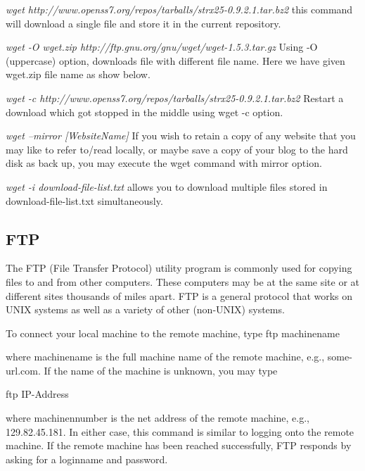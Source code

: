 \documentclass{article}
\begin{document}
\hspace{10mm} \textit{wget http://www.openss7.org/repos/tarballs/strx25-0.9.2.1.tar.bz2} this command will download a single file and store it in the current repository.

\hspace{10mm} \textit{wget -O wget.zip http://ftp.gnu.org/gnu/wget/wget-1.5.3.tar.gz} Using -O (uppercase) option, downloads file with different file name. Here we have given wget.zip file name as show below.

\hspace{10mm} \textit {wget -c http://www.openss7.org/repos/tarballs/strx25-0.9.2.1.tar.bz2} Restart a download which got stopped in the middle using wget -c option.

\hspace{10mm} \textit{wget --mirror [WebsiteName]} If you wish to retain a copy of any website that you may like to refer to/read locally, or maybe save a copy of your blog to the hard disk as back up, you may execute the wget command with mirror option.

\hspace{10mm} \textit{wget -i download-file-list.txt} allows you to download multiple files stored in download-file-list.txt simultaneously.



\newpage

\subsection {FTP}

The FTP (File Transfer Protocol) utility program is commonly used for copying files to and from other computers. These computers may be at the same site or at different sites thousands of miles apart. FTP is a general protocol that works on UNIX systems as well as a variety of other (non-UNIX) systems.

To connect your local machine to the remote machine, type
\hspace{10mm} ftp machinename

where machinename is the full machine name of the remote machine, e.g., some-url.com. If the name of the machine is unknown, you may type

\hspace{10mm}ftp IP-Address

where machinennumber is the net address of the remote machine, e.g., 129.82.45.181. In either case, this command is similar to logging onto the remote machine. If the remote machine has been reached successfully, FTP responds by asking for a loginname and password.
\end{document}
